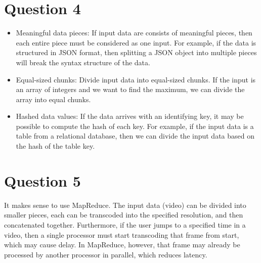 \documentclass{article}
\begin{document}
\section{Question 4}
\begin{itemize}
    \item Meaningful data pieces: If input data are consists of meaningful pieces, then each entire piece must be considered as one input. For example, if the data is structured in JSON format, then splitting a JSON object into multiple pieces will break the syntax structure of the data.
    \item Equal-sized chunks: Divide input data into equal-sized chunks. If the input is an array of integers and we want to find the maximum, we can divide the array into equal chunks.
    \item Hashed data values: If the data arrives with an identifying key, it may be possible to compute the hash of each key. For example, if the input data is a table from a relational database, then we can divide the input data based on the hash of the table key.
\end{itemize}

\section{Question 5}
It makes sense to use MapReduce. The input data (video) can be divided into smaller pieces, each can be transcoded into the specified resolution, and then concatenated together. Furthermore, if the user jumps to a specified time in a video, then a single processor must start transcoding that frame from start, which may cause delay. In MapReduce, however, that frame may already be processed by another processor in parallel, which reduces latency.
\end{document}
